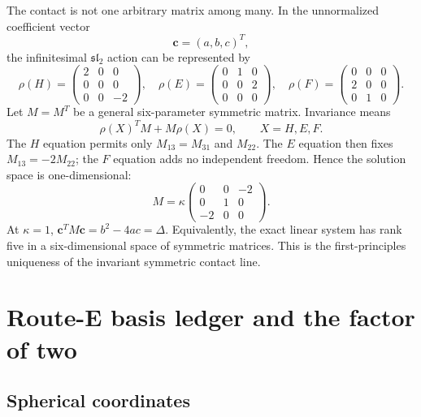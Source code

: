 \documentclass[11pt]{article}
\numberwithin{equation}{section}
\begin{document}
The contact is not one arbitrary matrix among many.  In the unnormalized
coefficient vector
\begin{equation}
 \bm c=(a,b,c)^T,
 \label{eq:coefficient-vector}
\end{equation}
the infinitesimal \(\mathfrak{sl}_2\) action can be represented by
\begin{equation}
 \rho(H)=\begin{pmatrix}2&0&0\\0&0&0\\0&0&-2\end{pmatrix},
 \quad
 \rho(E)=\begin{pmatrix}0&1&0\\0&0&2\\0&0&0\end{pmatrix},
 \quad
 \rho(F)=\begin{pmatrix}0&0&0\\2&0&0\\0&1&0\end{pmatrix}.
 \label{eq:coefficient-generators}
\end{equation}
Let \(M=M^T\) be a general six-parameter symmetric matrix.  Invariance means
\begin{equation}
 \rho(X)^TM+M\rho(X)=0,
 \qquad X=H,E,F.
 \label{eq:invariance-equations}
\end{equation}
The \(H\) equation permits only \(M_{13}=M_{31}\) and \(M_{22}\).
The \(E\) equation then fixes \(M_{13}=-2M_{22}\); the \(F\) equation adds
no independent freedom.  Hence the solution space is one-dimensional:
\begin{equation}
 M=\kappa
 \begin{pmatrix}
 0&0&-2\\
 0&1&0\\
 -2&0&0
 \end{pmatrix}.
 \label{eq:unique-coefficient-contact}
\end{equation}
At \(\kappa=1\),
\(\bm c^TM\bm c=b^2-4ac=\Delta\).  Equivalently, the exact linear system has
rank five in a six-dimensional space of symmetric matrices.  This is the
first-principles uniqueness of the invariant symmetric contact line.

\section{Route-E basis ledger and the factor of two}
\label{sec:route-e-basis}

\subsection{Spherical coordinates}
\end{document}
